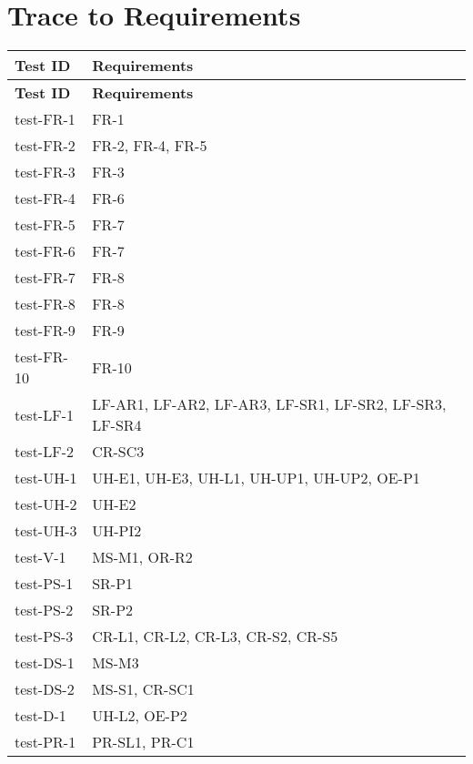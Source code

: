 \documentclass[12pt, titlepage]{article}
\begin{document}
\section{Trace to Requirements}

\begin{center}
    \begin{longtable}{|>{\centering\arraybackslash}p{4cm}|>{\centering\arraybackslash}p{10cm}|}
    \hline
    \textbf{Test ID} & \textbf{Requirements} \\
    \hline
    \endfirsthead
    
    \hline
    \textbf{Test ID} & \textbf{Requirements} \\
    \hline
    \endhead
    
    test-FR-1 & FR-1 \\
    \hline
    test-FR-2 & FR-2, FR-4, FR-5 \\
    \hline
    test-FR-3 & FR-3 \\
    \hline
    test-FR-4 & FR-6 \\
    \hline
    test-FR-5 & FR-7 \\
    \hline
    test-FR-6 & FR-7 \\
    \hline
    test-FR-7 & FR-8 \\
    \hline
    test-FR-8 & FR-8 \\
    \hline
    test-FR-9 & FR-9 \\
    \hline
    test-FR-10 & FR-10 \\
    \hline
    test-LF-1 & LF-AR1, LF-AR2, LF-AR3, LF-SR1, LF-SR2, LF-SR3, LF-SR4 \\
    \hline
    test-LF-2 & CR-SC3 \\
    \hline
    test-UH-1 & UH-E1, UH-E3, UH-L1, UH-UP1, UH-UP2, OE-P1 \\
    \hline
    test-UH-2 & UH-E2 \\
    \hline
    test-UH-3 & UH-PI2 \\
    \hline
    test-V-1 & MS-M1, OR-R2 \\
    \hline
    test-PS-1 & SR-P1 \\
    \hline
    test-PS-2 & SR-P2 \\
    \hline
    test-PS-3 & CR-L1, CR-L2, CR-L3, CR-S2, CR-S5 \\
    \hline
    test-DS-1 & MS-M3 \\
    \hline
    test-DS-2 & MS-S1, CR-SC1 \\
    \hline
    test-D-1 & UH-L2, OE-P2 \\
    \hline
    test-PR-1 & PR-SL1, PR-C1 \\

\end{longtable}
\end{center}
\end{document}
